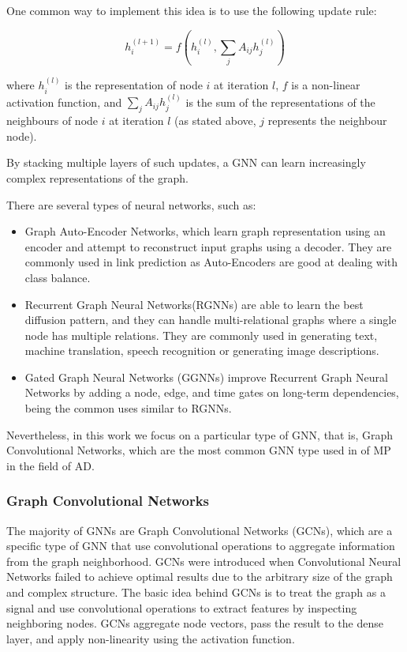 One common way to implement this idea is to use the following update rule:

\begin{equation}
h_i^{(l+1)} = f(h_i^{(l)}, \sum_{j} A_{ij} h_j^{(l)})
\end{equation}

where $h_i^{(l)}$ is the representation of node $i$ at iteration $l$, $f$ is a non-linear activation function, and $\sum_{j} A_{ij} h_j^{(l)}$ is the sum of the representations of the neighbours of node $i$ at iteration $l$ (as stated above, $j$ represents the neighbour node).

By stacking multiple layers of such updates, a GNN can learn increasingly complex representations of the graph.

There are several types of neural networks, such as:

\begin{itemize}
	
	\item Graph Auto-Encoder Networks, which learn graph representation using an encoder and attempt to reconstruct input graphs using a decoder. They are commonly used in link prediction as Auto-Encoders are good at dealing with class balance. 
	
	\item Recurrent Graph Neural Networks(RGNNs) are able to learn the best diffusion pattern, and they can handle multi-relational graphs where a single node has multiple relations. They are commonly used in generating text, machine translation, speech recognition or generating image descriptions.
	
	\item Gated Graph Neural Networks (GGNNs) improve Recurrent Graph Neural Networks by adding a node, edge, and time gates on long-term dependencies, being the common uses similar to RGNNs.
	
\end{itemize}

Nevertheless, in this work we focus on a particular type of GNN, that is, Graph Convolutional Networks, which are the most common GNN type used in of \ac{MP} in the field of \ac{AD}.

\subsubsection{Graph Convolutional Networks}
\label{subsubsec:3_gcns}

The majority of GNNs are Graph Convolutional Networks (GCNs), which are a specific type of GNN that use convolutional operations to aggregate information from the graph neighborhood. GCNs were introduced when Convolutional Neural Networks failed to achieve optimal results due to the arbitrary size of the graph and complex structure. The basic idea behind GCNs is to treat the graph as a signal and use convolutional operations to extract features by inspecting neighboring nodes. GCNs aggregate node vectors, pass the result to the dense layer, and apply non-linearity using the activation function. 

